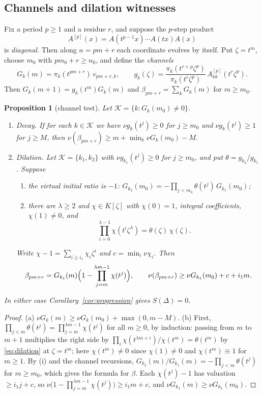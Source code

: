 \documentclass[11pt,a4paper]{article}
\newcommand{\val}{\nu}
\theoremstyle{plain}
\newtheorem{proposition}[theorem]{Proposition}
\theoremstyle{definition}
\theoremstyle{remark}
\begin{document}
\subsection{Channels and dilation witnesses}
Fix a period $p\ge1$ and a residue $r$, and suppose the $p$-step product
\[
  A^{[p]}(x)=A(t^{p-1}x)\cdots A(tx)A(x)
\]
is \emph{diagonal}. Then along $n=pm+r$ each coordinate evolves by itself.
Put $\zeta=t^m$, choose $m_0$ with $pm_0+r\ge n_0$, and define the
\emph{channels}
\[
  G_k(m)=\pi_k(t^{pm+r})\,v_{pm+r,k},\qquad
  g_k(\zeta)=\frac{\pi_k(t^{r+p}\zeta^p)}{\pi_k(t^r\zeta^p)}\,A^{[p]}_{kk}(t^r\zeta^p).
\]
Then $G_k(m+1)=g_k(t^m)G_k(m)$ and $\beta_{pm+r}=\sum_kG_k(m)$ for $m\ge m_0$.

\begin{proposition}[channel test]\label{prop:channels}
Let $\mathcal K=\{k:G_k(m_0)\ne0\}$.
\begin{enumerate}[label=(\alph*)]
\item \emph{Decay.} If for each $k\in\mathcal K$ we have $\val g_k(t^j)\ge0$
  for $j\ge m_0$ and $\val g_k(t^j)\ge1$ for $j\ge M$, then
  $\val(\beta_{pm+r})\ge m+\min_k\val G_k(m_0)-M$.
\item \emph{Dilation.} Let $\mathcal K=\{k_1,k_2\}$ with $\val g_{k_1}(t^j)\ge0$
  for $j\ge m_0$, and put $\theta=g_{k_2}/g_{k_1}$. Suppose
  \begin{enumerate}[label=(\roman*)]
  \item the virtual initial ratio is $-1$:
    $G_{k_2}(m_0)=-\prod_{j<m_0}\theta(t^j)\,G_{k_1}(m_0)$;
  \item there are $\lambda\ge2$ and $\chi\in K[\zeta]$ with $\chi(0)=1$, integral
    coefficients, $\chi(1)\ne0$, and
    \begin{equation}\label{eq:dilation}
      \prod_{i=0}^{\lambda-1}\chi(t^i\zeta^\lambda)=\theta(\zeta)\,\chi(\zeta).
    \end{equation}
  \end{enumerate}
  Write $\chi-1=\sum_{i\ge i_1}\chi_i\zeta^i$ and $c=\min_i\val\chi_i$. Then
  \[
    \beta_{pm+r}=G_{k_1}(m)\Bigl(1-\prod_{j=m}^{\lambda m-1}\chi(t^j)\Bigr),
    \qquad
    \val(\beta_{pm+r})\ge\val G_{k_1}(m_0)+c+i_1m.
  \]
\end{enumerate}
In either case Corollary~\ref{cor:progression} gives $S(\Delta)=0$.
\end{proposition}
\begin{proof}
(a) $\val G_k(m)\ge\val G_k(m_0)+\max(0,m-M)$.
(b) First, $\prod_{j<m}\theta(t^j)=\prod_{j=m}^{\lambda m-1}\chi(t^j)$ for all
$m\ge0$, by induction: passing from $m$ to $m+1$ multiplies the right side by
$\prod_i\chi(t^{\lambda m+i})/\chi(t^m)=\theta(t^m)$ by \eqref{eq:dilation}
at $\zeta=t^m$; here $\chi(t^m)\ne0$ since $\chi(1)\ne0$ and $\chi(t^m)\equiv1$
for $m\ge1$. By (i) and the channel recursions,
$G_{k_2}(m)/G_{k_1}(m)=-\prod_{j<m}\theta(t^j)$ for $m\ge m_0$, which gives the
formula for $\beta$. Each $\chi(t^j)-1$ has valuation $\ge i_1j+c$, so
$\val\bigl(1-\prod_{j=m}^{\lambda m-1}\chi(t^j)\bigr)\ge i_1m+c$, and
$\val G_{k_1}(m)\ge\val G_{k_1}(m_0)$.
\end{proof}
\end{document}
